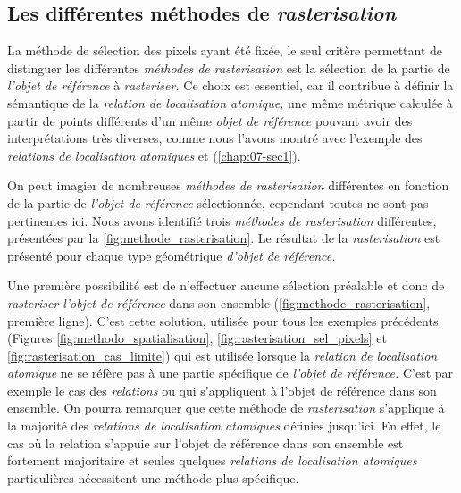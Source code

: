 \subsection{Les différentes méthodes de \emph{rasterisation}}

La méthode de sélection des pixels ayant été fixée, le seul critère
permettant de distinguer les différentes \emph{méthodes de
  rasterisation} est la sélection de la partie de \emph{l'objet de
  référence} à \emph{rasteriser.} Ce choix est essentiel, car il
contribue à définir la sémantique de la \emph{relation de localisation
  atomique,} une même métrique calculée à partir de points différents
d'un même \emph{objet de référence} pouvant avoir des interprétations
très diverses, comme nous l'avons montré avec l'exemple des
\emph{relations de localisation atomiques}
 et 
(\autoref{chap:07-sec1}).

On peut imagier de nombreuses \emph{méthodes de rasterisation}
différentes en fonction de la partie de \emph{l'objet de référence}
sélectionnée, cependant toutes ne sont pas pertinentes ici. Nous avons
identifié trois \emph{méthodes de rasterisation} différentes,
présentées par la \autoref{fig:methode_rasterisation}. Le résultat de
la \emph{rasterisation} est présenté pour chaque type géométrique
\emph{d'objet de référence.}

Une première possibilité est de n'effectuer aucune sélection préalable
et donc de \emph{rasteriser} \emph{l'objet de référence} dans son
ensemble (\autoref{fig:methode_rasterisation}, première ligne). C'est
cette solution, utilisée pour tous les exemples précédents (Figures
\ref{fig:methodo_spatialisation}, \ref{fig:rasterisation_sel_pixels}
et \ref{fig:rasterisation_cas_limite}) qui est utilisée lorsque la
\emph{relation de localisation atomique} ne se réfère pas à une partie
spécifique de \emph{l'objet de référence.} C'est par exemple le cas
des \emph{relations}  ou 
qui s'appliquent à l'objet de référence dans son ensemble. On pourra
remarquer que cette méthode de \emph{rasterisation} s'applique à la
majorité des \emph{relations de localisation atomiques} définies
jusqu'ici. En effet, le cas où la relation s'appuie sur l'objet de
référence dans son ensemble est fortement majoritaire et seules
quelques \emph{relations de localisation atomiques} particulières
nécessitent une méthode plus spécifique.

